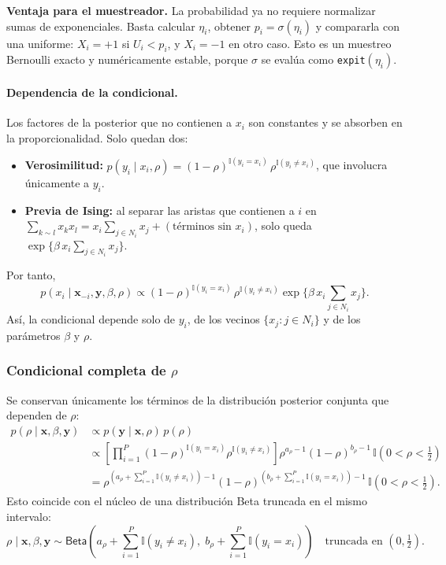 \documentclass[11pt,a4paper]{article}
\begin{document}
\textbf{Ventaja para el muestreador.} La probabilidad ya no requiere normalizar sumas de exponenciales. Basta calcular $\eta_i$, obtener $p_i = \sigma(\eta_i)$ y compararla con una uniforme: $X_i = +1$ si $U_i < p_i$, y $X_i = -1$ en otro caso. Esto es un muestreo Bernoulli exacto y numéricamente estable, porque $\sigma$ se evalúa como \texttt{expit}$(\eta_i)$.

\paragraph{Dependencia de la condicional.}
Los factores de la posterior que no contienen a $x_i$ son constantes y se absorben en la proporcionalidad. Solo quedan dos:
\begin{itemize}
    \item \textbf{Verosimilitud:} $p(y_i \mid x_i, \rho) = (1-\rho)^{\mathbb{I}(y_i = x_i)}\, \rho^{\mathbb{I}(y_i \neq x_i)}$, que involucra únicamente a $y_i$.
    \item \textbf{Previa de Ising:} al separar las aristas que contienen a $i$ en $\sum_{k\sim l} x_k x_l = x_i \sum_{j\in N_i} x_j + (\text{términos sin } x_i)$, solo queda $\exp\{\beta\, x_i \sum_{j\in N_i} x_j\}$.
\end{itemize}
Por tanto,
\[
p(x_i \mid \boldsymbol{x}_{-i}, \boldsymbol{y}, \beta, \rho) \propto (1-\rho)^{\mathbb{I}(y_i = x_i)}\, \rho^{\mathbb{I}(y_i \neq x_i)} \exp\Big\{\beta\, x_i \sum_{j\in N_i} x_j\Big\}.
\]
Así, la condicional depende solo de $y_i$, de los vecinos $\{x_j : j \in N_i\}$ y de los parámetros $\beta$ y $\rho$.

\subsubsection*{Condicional completa de $\rho$}

Se conservan únicamente los términos de la distribución posterior conjunta que dependen de $\rho$:
\begin{align*}
p(\rho \mid \boldsymbol{x}, \beta, \boldsymbol{y}) &\propto p(\boldsymbol{y} \mid \boldsymbol{x}, \rho)\, p(\rho) \\[6pt]
&\propto \left[ \prod_{i=1}^{P} (1 - \rho)^{\mathbb{I}(y_i = x_i)} \rho^{\mathbb{I}(y_i \neq x_i)} \right] \rho^{a_\rho - 1} (1 - \rho)^{b_\rho - 1} \, \mathbb{I}\!\left(0 < \rho < \tfrac{1}{2}\right) \\[6pt]
&= \rho^{\left(a_\rho + \sum_{i=1}^{P} \mathbb{I}(y_i \neq x_i)\right) - 1} (1 - \rho)^{\left(b_\rho + \sum_{i=1}^{P} \mathbb{I}(y_i = x_i)\right) - 1} \, \mathbb{I}\!\left(0 < \rho < \tfrac{1}{2}\right).
\end{align*}
Esto coincide con el núcleo de una distribución Beta truncada en el mismo intervalo:
\[
\rho \mid \boldsymbol{x}, \beta, \boldsymbol{y} \sim \textsf{Beta}\!\left( a_\rho + \sum_{i=1}^{P} \mathbb{I}(y_i \neq x_i), \; b_\rho + \sum_{i=1}^{P} \mathbb{I}(y_i = x_i) \right) \quad \text{truncada en } \left(0, \tfrac{1}{2}\right).
\]
\end{document}
